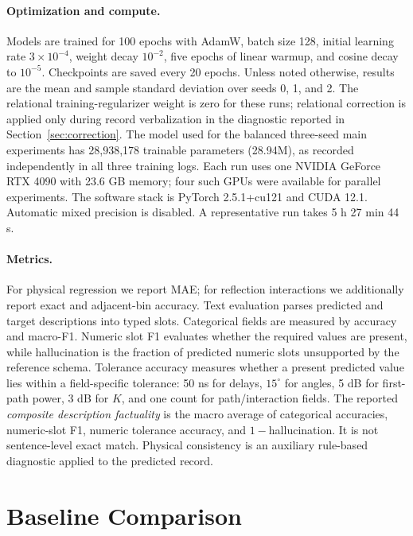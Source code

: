 \documentclass{article}
\begin{document}
\paragraph{Optimization and compute.}
Models are trained for 100 epochs with AdamW, batch size 128, initial learning rate $3{\times}10^{-4}$, weight decay $10^{-2}$, five epochs of linear warmup, and cosine decay to $10^{-5}$.
Checkpoints are saved every 20 epochs.
Unless noted otherwise, results are the mean and sample standard deviation over seeds 0, 1, and 2.
The relational training-regularizer weight is zero for these runs; relational correction is applied only during record verbalization in the diagnostic reported in Section~\ref{sec:correction}.
The model used for the balanced three-seed main experiments has 28,938,178 trainable parameters (28.94M), as recorded independently in all three training logs.
Each run uses one NVIDIA GeForce RTX 4090 with 23.6 GB memory; four such GPUs were available for parallel experiments.
The software stack is PyTorch 2.5.1+cu121 and CUDA 12.1.
Automatic mixed precision is disabled.
A representative run takes 5 h 27 min 44 s.

\paragraph{Metrics.}
For physical regression we report MAE; for reflection interactions we additionally report exact and adjacent-bin accuracy.
Text evaluation parses predicted and target descriptions into typed slots.
Categorical fields are measured by accuracy and macro-F1.
Numeric slot F1 evaluates whether the required values are present, while hallucination is the fraction of predicted numeric slots unsupported by the reference schema.
Tolerance accuracy measures whether a present predicted value lies within a field-specific tolerance: 50 ns for delays, $15^\circ$ for angles, 5 dB for first-path power, 3 dB for $K$, and one count for path/interaction fields.
The reported \emph{composite description factuality} is the macro average of categorical accuracies, numeric-slot F1, numeric tolerance accuracy, and $1-$hallucination.
It is not sentence-level exact match.
Physical consistency is an auxiliary rule-based diagnostic applied to the predicted record.

\section{Baseline Comparison}
\label{sec:baselines}
\end{document}

